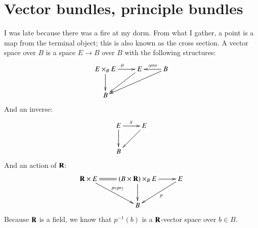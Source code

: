 \section{Vector bundles, principle bundles}
I was late because there was a fire at my dorm. From what I gather, a point is a map from the terminal object; this is also known as the cross section. A vector space over $B$ is a space $E\to B$ over $B$ with the following structures:
\begin{equation*}
    \xymatrix{
	E\times_B E\ar[d]\ar[r]^\mu & E\ar[dl] & B\ar[l]_{zero}\ar[dll]\\
	B
    }
\end{equation*}
And an inverse:
\begin{equation*}
    \xymatrix{
	E\ar[d]\ar[r]^\chi & E\ar[dl]\\
	B &
    }
\end{equation*}
And an action of $\mathbf R$:
\begin{equation*}
    \xymatrix{
	\RR\times E\ar[dr]^{p\circ pr_2}\ar@{=}[r] & (B\times\RR)\times_B E\ar[r]\ar[d] & E\ar[dl]^p\\
	& B &
    }
\end{equation*}
Because $\mathbf R$ is a field, we know that $p^{-1}(b)$ is a $\mathbf R$-vector space over $b\in B$.

